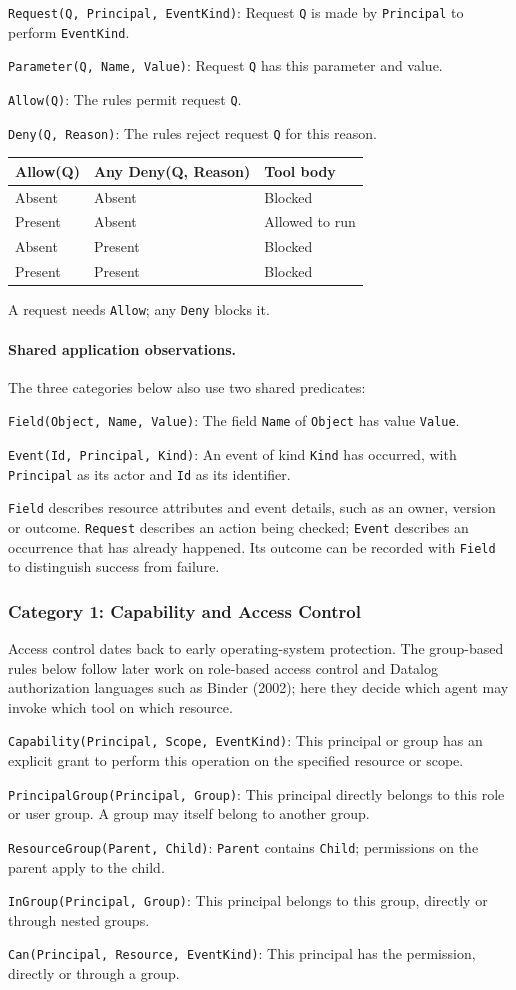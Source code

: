 \documentclass[10pt,letterpaper]{article}
\newcommand{\pred}[2]{\texttt{#1}: #2\par}
\begin{document}
\pred{Request(Q, Principal, EventKind)}{Request \texttt{Q} is made by
\texttt{Principal} to perform \texttt{EventKind}.}
\pred{Parameter(Q, Name, Value)}{Request \texttt{Q} has this parameter and value.}
\pred{Allow(Q)}{The rules permit request \texttt{Q}.}
\pred{Deny(Q, Reason)}{The rules reject request \texttt{Q} for this reason.}
\begin{center}
\begin{tabular}{lll}
\textbf{Allow(Q)} & \textbf{Any Deny(Q, Reason)} & \textbf{Tool body} \\
\hline
Absent & Absent & Blocked \\
Present & Absent & Allowed to run \\
Absent & Present & Blocked \\
Present & Present & Blocked
\end{tabular}
\end{center}
A request needs \texttt{Allow}; any \texttt{Deny} blocks it.

\paragraph{Shared application observations.}
The three categories below also use two shared predicates:

\pred{Field(Object, Name, Value)}{The field \texttt{Name} of
\texttt{Object} has value \texttt{Value}.}
\pred{Event(Id, Principal, Kind)}{An event of kind \texttt{Kind} has
occurred, with \texttt{Principal} as its actor and \texttt{Id} as its identifier.}

\texttt{Field} describes resource attributes and event details, such as an
owner, version or outcome. \texttt{Request} describes an action being checked;
\texttt{Event} describes an occurrence that has already happened. Its outcome
can be recorded with \texttt{Field} to distinguish success from failure.

\subsubsection{Category 1: Capability and Access Control}
\label{sec:cat-ac}
Access control dates back to early operating-system protection. The
group-based rules below follow later work on role-based access control and
Datalog authorization languages such as Binder (2002); here they decide which
agent may invoke which tool on which resource.

\pred{Capability(Principal, Scope, EventKind)}{This principal or group has
an explicit grant to perform this operation on the specified resource or scope.}
\pred{PrincipalGroup(Principal, Group)}{This principal directly belongs to
this role or user group. A group may itself belong to another group.}
\pred{ResourceGroup(Parent, Child)}{\texttt{Parent} contains \texttt{Child};
permissions on the parent apply to the child.}
\pred{InGroup(Principal, Group)}{This principal belongs to this group,
directly or through nested groups.}
\pred{Can(Principal, Resource, EventKind)}{This principal has the permission,
directly or through a group.}
\end{document}
